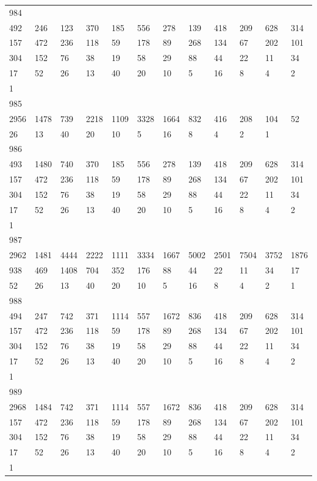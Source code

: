 \begin{longtable}{llllllllllll}
984&&&&&&&&&&&\\
492& 246& 123& 370& 185& 556& 278& 139& 418& 209& 628& 314\\
157& 472& 236& 118& 59& 178& 89& 268& 134& 67& 202& 101\\
304& 152& 76& 38& 19& 58& 29& 88& 44& 22& 11& 34\\
17& 52& 26& 13& 40& 20& 10& 5& 16& 8& 4& 2\\
1& \\

985&&&&&&&&&&&\\
2956& 1478& 739& 2218& 1109& 3328& 1664& 832& 416& 208& 104& 52\\
26& 13& 40& 20& 10& 5& 16& 8& 4& 2& 1& \\

986&&&&&&&&&&&\\
493& 1480& 740& 370& 185& 556& 278& 139& 418& 209& 628& 314\\
157& 472& 236& 118& 59& 178& 89& 268& 134& 67& 202& 101\\
304& 152& 76& 38& 19& 58& 29& 88& 44& 22& 11& 34\\
17& 52& 26& 13& 40& 20& 10& 5& 16& 8& 4& 2\\
1& \\

987&&&&&&&&&&&\\
2962& 1481& 4444& 2222& 1111& 3334& 1667& 5002& 2501& 7504& 3752& 1876\\
938& 469& 1408& 704& 352& 176& 88& 44& 22& 11& 34& 17\\
52& 26& 13& 40& 20& 10& 5& 16& 8& 4& 2& 1\\

988&&&&&&&&&&&\\
494& 247& 742& 371& 1114& 557& 1672& 836& 418& 209& 628& 314\\
157& 472& 236& 118& 59& 178& 89& 268& 134& 67& 202& 101\\
304& 152& 76& 38& 19& 58& 29& 88& 44& 22& 11& 34\\
17& 52& 26& 13& 40& 20& 10& 5& 16& 8& 4& 2\\
1& \\

989&&&&&&&&&&&\\
2968& 1484& 742& 371& 1114& 557& 1672& 836& 418& 209& 628& 314\\
157& 472& 236& 118& 59& 178& 89& 268& 134& 67& 202& 101\\
304& 152& 76& 38& 19& 58& 29& 88& 44& 22& 11& 34\\
17& 52& 26& 13& 40& 20& 10& 5& 16& 8& 4& 2\\
1& \\


\end{longtable}

